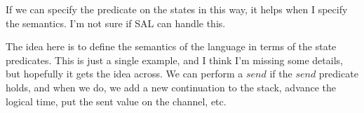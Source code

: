 \documentclass[9pt]{article}
\begin{document}
  \SyntaxFigure

  \StatePredFigure

  If we can specify the predicate on the states in this way, it helps
  when I specify the semantics. I'm not sure if SAL can handle this.

\clearpage

  \SemanticsFigure
   The idea here is to define the semantics of the language in terms of
   the state predicates. This is just a single example, and I think I'm
   missing some details, but hopefully it gets the idea across. We can
   perform a $send$ if the $send$ predicate holds, and when we do, we
   add a new continuation to the stack, advance the logical time, put
   the sent value on the channel, etc.

% 
% 
% 
% 
\end{document}

